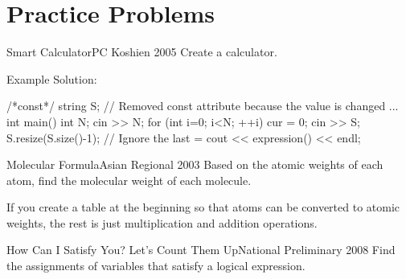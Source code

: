 \section{Practice Problems}

\begin{pbox}{Smart Calculator}{PC Koshien 2005}
Create a calculator.

\end{pbox}

Example Solution:
\begin{cbox}
/*const*/ string S; // Removed const attribute because the value is changed
...
int main() {
    int N;
    cin >> N;
    for (int i=0; i<N; ++i) {
        cur = 0;
        cin >> S;
        S.resize(S.size()-1); // Ignore the last =
        cout << expression() << endl;
    }
}  
\end{cbox}

\begin{pbox}{Molecular Formula}{Asian Regional 2003}
Based on the atomic weights of each atom, find the molecular weight of each molecule.

\end{pbox}

If you create a table at the beginning so that atoms can be converted to atomic weights, the rest is just multiplication and addition operations.

\begin{pbox}{How Can I Satisfy You? Let's Count Them Up}{National Preliminary 2008}
Find the assignments of variables that satisfy a logical expression.

\end{pbox}

